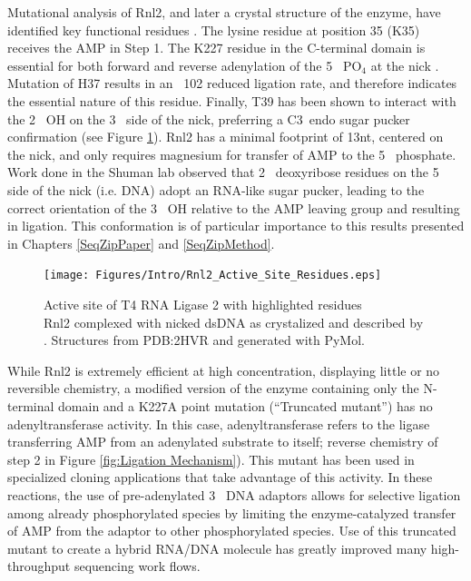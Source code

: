     Mutational analysis of Rnl2, and later a crystal structure of the enzyme, have identified key functional residues \citep{Ho2004, Nandakumar2006,Nandakumar2004a,Yin2003d}. The lysine residue at position 35 (K35) receives the AMP in Step 1. The K227 residue in the C-terminal domain is essential for both forward and reverse adenylation of the 5\textprime~ PO$_4$ at the nick \citep{Viollet2011}. Mutation of H37 results in an ~102 reduced ligation rate, and therefore indicates the essential nature of this residue. Finally, T39 has been shown to interact with the 2\textprime~ OH on the 3\textprime~ side of the nick, preferring a C3\textprime~endo sugar pucker confirmation (see Figure \ref{fig:Rnl2 Active Site Residues}). Rnl2 has a minimal footprint of 13nt, centered on the nick, and only requires magnesium for transfer of AMP to the 5\textprime~ phosphate. Work done in the Shuman lab \citep{Nandakumar2006} observed that 2\textprime~ deoxyribose residues on the 5\textprime~ side of the nick (i.e. DNA) adopt an RNA-like sugar pucker, leading to the correct orientation of the 3\textprime~ OH relative to the AMP leaving group and resulting in ligation. This conformation is of particular importance to this results presented in Chapters \ref{SeqZipPaper} and \ref{SeqZipMethod}.

    \begin{figure}[htbp] %
      \centering 
      \texttt{[image: Figures/Intro/Rnl2\_Active\_Site\_Residues.eps]}
      \caption[Active site of T4 RNA Ligase 2 with highlighted residues]
      {
        Active site of T4 RNA Ligase 2 with highlighted residues\\[0.25cm]
        Rnl2 complexed with nicked dsDNA as crystalized and described by \citep{Nandakumar2006}. Structures from PDB:2HVR and generated with PyMol.
        }
      \label{fig:Rnl2 Active Site Residues}
      \end{figure}

    While Rnl2 is extremely efficient at high concentration, displaying little or no reversible chemistry, a modified version of the enzyme containing only the N-terminal domain and a K227A point mutation (“Truncated mutant”) has no adenyltransferase activity. In this case, adenyltransferase refers to the ligase transferring AMP from an adenylated substrate to itself; reverse chemistry of step 2 in Figure \ref{fig:Ligation Mechanism}). This mutant has been used in specialized cloning applications \citep{Ghildiyal2008, Hafner2008a, Viollet2011} that take advantage of this activity. In these reactions, the use of pre-adenylated 3\textprime~ DNA adaptors allows for selective ligation among already phosphorylated species by limiting the enzyme-catalyzed transfer of AMP from the adaptor to other phosphorylated species. Use of this truncated mutant to create a hybrid RNA/DNA molecule has greatly improved many high-throughput sequencing work flows.

